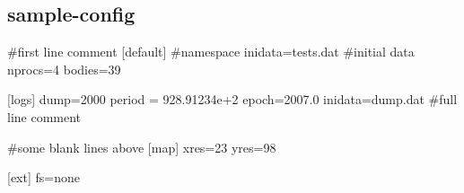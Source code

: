 \hypertarget{sample-config-example}{
\subsection{sample-\/config}
}

\begin{DoxyCodeInclude}
#first line comment
[default] #namespace
inidata=tests.dat #initial data
nprocs=4
bodies=39

[logs]
        dump=2000
        period = 928.91234e+2
        epoch=2007.0
        inidata=dump.dat
#full line comment

#some blank lines above
[map]
xres=23
yres=98

[ext]
fs=none
\end{DoxyCodeInclude}
 
